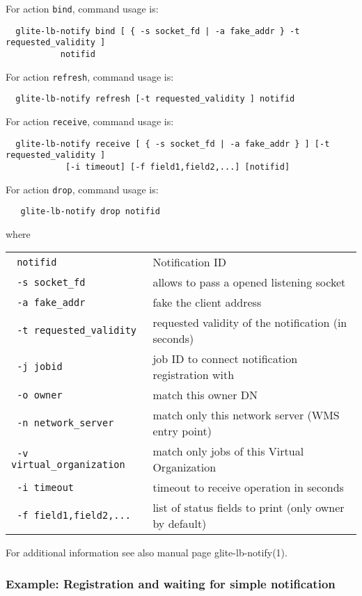 For action \verb'bind', command usage is:
\begin{verbatim}
  glite-lb-notify bind [ { -s socket_fd | -a fake_addr } -t requested_validity ] 
           notifid
\end{verbatim}

For action \verb'refresh', command usage is:
\begin{verbatim}
  glite-lb-notify refresh [-t requested_validity ] notifid
\end{verbatim}

For action \verb'receive', command usage is:
\begin{verbatim}
  glite-lb-notify receive [ { -s socket_fd | -a fake_addr } ] [-t requested_validity ] 
            [-i timeout] [-f field1,field2,...] [notifid]
\end{verbatim}

For action \verb'drop', command usage is:
\begin{verbatim}
   glite-lb-notify drop notifid
\end{verbatim}

where

\begin{tabularx}{\textwidth}{lX}
\texttt{  notifid} & Notification ID \\
\texttt{  -s socket\_fd} &  allows  to  pass  a opened listening socket  \\
\texttt{  -a fake\_addr} &  fake the client address \\
\texttt{  -t requested\_validity} & requested validity of the notification (in seconds)   \\
\texttt{  -j jobid} & job ID to connect notification registration with   \\
\texttt{  -o owner} & match this owner DN   \\
\texttt{  -n network\_server} &  match only this network server (WMS entry point)  \\
\texttt{  -v virtual\_organization} & match only jobs of this Virtual Organization  \\
\texttt{  -i timeout} & timeout to receive operation in seconds   \\
\texttt{  -f field1,field2,...} & list of status fields to print (only owner by default)   \\
\end{tabularx}

For additional information see also manual page glite-lb-notify(1).

\subsubsection{Example: Registration and waiting for simple notification}
\label{e:notify}

